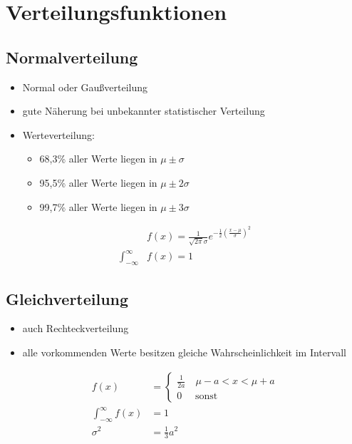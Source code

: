 \section{Verteilungsfunktionen}
	\subsection{Normalverteilung}
	\begin{itemize}
	  \item Normal oder Gaußverteilung
	  \item gute Näherung bei unbekannter statistischer Verteilung
	  \item Werteverteilung: \begin{itemize}
	    \item 68,3\% aller Werte liegen in \( \mu \pm \sigma \)
	    \item 95,5\% aller Werte liegen in \( \mu \pm 2\sigma \)
	    \item 99,7\% aller Werte liegen in \( \mu \pm 3\sigma \) 
	  \end{itemize}
	\end{itemize}
	
	\begin{align*}
		&f\left( x \right) = \frac{1}{\sqrt{2 \pi} \sigma} e^{-\frac{1}{2}\left(
		\frac{x - \mu}{\sigma} \right)^2}\\
		\int_{-\infty}^{\infty} &f\left( x \right) = 1
	\end{align*}

	\subsection{Gleichverteilung}
	\begin{itemize}
	  \item auch Rechteckverteilung
	  \item alle vorkommenden Werte besitzen gleiche Wahrscheinlichkeit im
	  Intervall
	\end{itemize}
	
	\begin{align*}
		f\left( x \right) &= 
			\begin{cases}
				\frac{1}{2a} \quad \mu - a < x < \mu + a\\
				0 \quad \text{ sonst}
			\end{cases}\\
		\int_{-\infty}^{\infty}f\left(x\right) &= 1\\
		\sigma^2 &= \frac{1}{3}a^2
	\end{align*}
	
